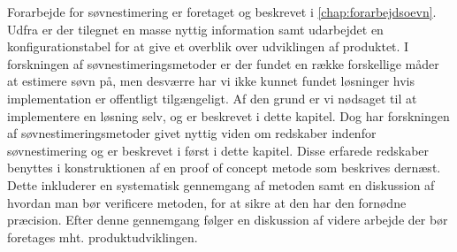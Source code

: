 Forarbejde for søvnestimering er foretaget og beskrevet i \cref{chap:forarbejdsoevn}.
Udfra er der tilegnet en masse nyttig information samt udarbejdet en konfigurationstabel for at give et overblik over udviklingen af produktet.
I forskningen af søvnestimeringsmetoder er der fundet en række forskellige måder at estimere søvn på, men desværre har vi ikke kunnet fundet løsninger hvis implementation er offentligt tilgængeligt.
Af den grund er vi nødsaget til at implementere en løsning selv, og er beskrevet i dette kapitel.
Dog har forskningen af søvnestimeringsmetoder givet nyttig viden om redskaber indenfor søvnestimering og er beskrevet i først i dette kapitel.
Disse erfarede redskaber benyttes i konstruktionen af en proof of concept metode som beskrives dernæst.
Dette inkluderer en systematisk gennemgang af metoden samt en diskussion af hvordan man bør verificere metoden, for at sikre at den har den fornødne præcision.
Efter denne gennemgang følger en diskussion af videre arbejde der bør foretages mht. produktudviklingen.






